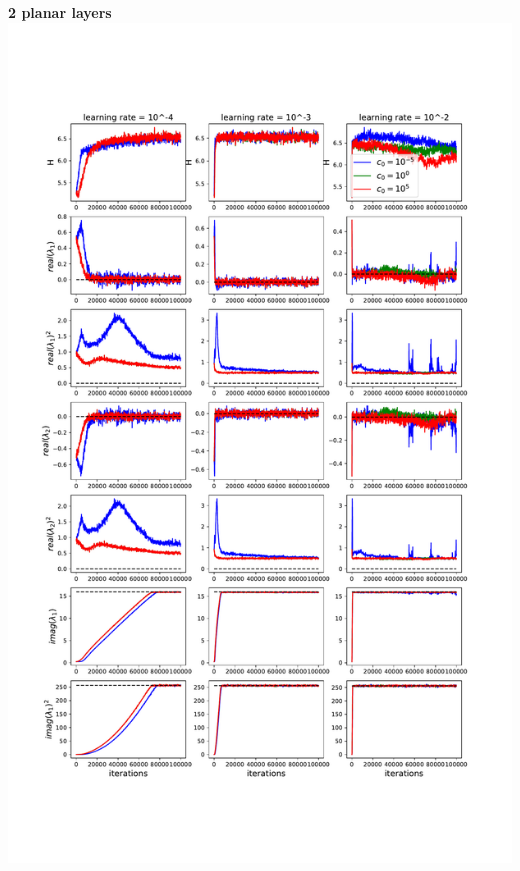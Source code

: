 \documentclass[11pt]{article}
\begin{document}
\clearpage
\begin{center}
\textbf{2 planar layers} \\
\includegraphics[scale=.45]{images/learnA_2P.pdf} \\
\end{center}
\end{document}
